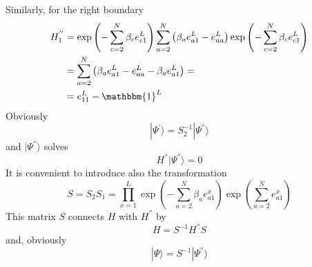 \documentclass[11pt]{article}
\numberwithin{equation}{section}
\numberwithin{equation}{subsection}
\begin{document}
Similarly, for the right boundary
\begin{equation}
	\begin{split}
			H_{1}^{''}&=\exp{\left(-\sum_{c=2}^{N}\beta_{c}e_{c1}^{L}\right)}\sum_{a=2}^{N}\left(\beta_{a}e_{a1}^{L}-e_{aa}^{L}\right)\exp{\left(-\sum_{c=2}^{N}\beta_{c}e_{c1}^{L}\right)}
			\\&=
			\sum_{a=2}^{N}\left(\beta_{a}e_{a1}^{L}-e_{aa}^{L}-\beta_{a}e_{a1}^{L}\right)=
			\\&=
			e_{11}^{L}-\mathbbm{1}^{L}
	\end{split}
\end{equation}
Obviously
\begin{equation}\label{S2-Inverse}
	|\Psi^{'}\rangle = S_{2}^{-1}|\Psi^{''}\rangle
\end{equation}
and $|\Psi^{''}\rangle$ solves
\begin{equation}
	H^{''}|\Psi^{''}\rangle=0
\end{equation}
It is convenient to introduce also the transformation
\begin{equation}\label{similarity}
	S=S_{2}S_{1}=\prod_{x=1}^{L}\exp{\left(-\sum_{a=2}^{N}\beta_{a}e_{a1}^{x}\right)}\exp{\left(\sum_{a=2}^{N}e_{a1}^{x}\right)}
\end{equation}
This matrix $S$ connects $H$ with $H^{''}$ by 
\begin{equation}
H=S^{-1}H^{''}S
\end{equation}
and, obviously
\begin{equation}
	|\Psi\rangle=S^{-1}|\Psi^{''}\rangle
\end{equation}
\end{document}
